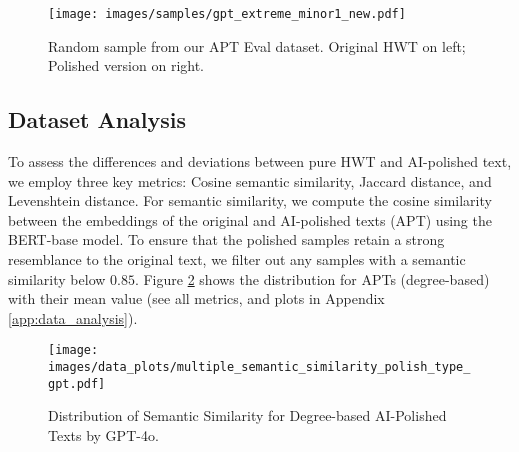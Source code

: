 \begin{figure}
    \centering
    \texttt{[image: images/samples/gpt\_extreme\_minor1\_new.pdf]}
    \caption{Random sample from our APT Eval dataset. Original HWT on left; Polished version on right.}
    \label{fig:extreme_minor_gpt_sample}
\end{figure}


\subsection{Dataset Analysis}
To assess the differences and deviations between pure HWT and AI-polished text, we employ three key metrics: Cosine semantic similarity, Jaccard distance, and Levenshtein distance. For semantic similarity, we compute the cosine similarity between the embeddings of the original and AI-polished texts (APT) using the BERT-base model. To ensure that the polished samples retain a strong resemblance to the original text, we filter out any samples with a semantic similarity below $0.85$. Figure \ref{fig:sem_sim_gpt4} shows the distribution for APTs (degree-based) with their mean value (see all metrics, and plots in Appendix \ref{app:data_analysis}).

\begin{figure}
    \centering
    \texttt{[image: images/data\_plots/multiple\_semantic\_similarity\_polish\_type\_gpt.pdf]}
    \caption{Distribution of Semantic Similarity for Degree-based AI-Polished Texts by GPT-4o.}
    \label{fig:sem_sim_gpt4}
\end{figure}

